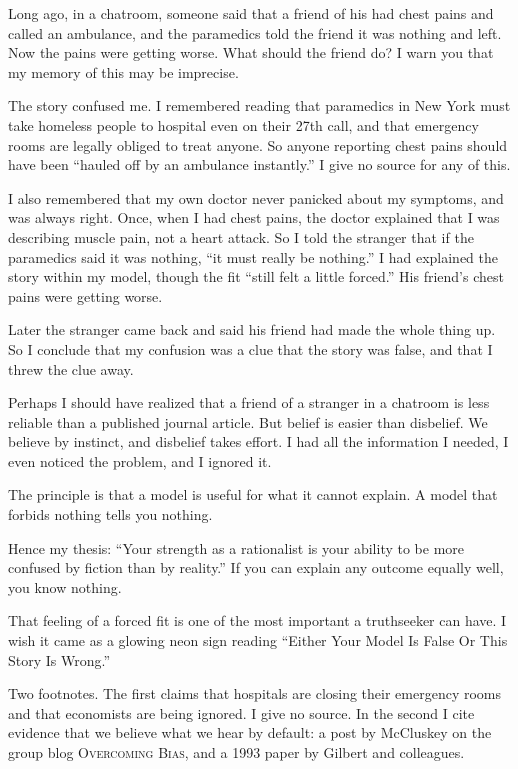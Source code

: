 
Long ago, in a chatroom, someone said that a friend of his had chest pains and called an ambulance, and the paramedics told the friend it was nothing and left. Now the pains were getting worse. What should the friend do? I warn you that my memory of this may be imprecise.

The story confused me. I remembered reading that paramedics in New York must take homeless people to hospital even on their 27th call, and that emergency rooms are legally obliged to treat anyone. So anyone reporting chest pains should have been ``hauled off by an ambulance instantly.'' I give no source for any of this. 

I also remembered that my own doctor never panicked about my symptoms, and was always right. Once, when I had chest pains, the doctor explained that I was describing muscle pain, not a heart attack. So I told the stranger that if the paramedics said it was nothing, ``it must really be nothing.'' I had explained the story within my model, though the fit ``still felt a little forced.'' His friend's chest pains were getting worse. 

Later the stranger came back and said his friend had made the whole thing up. So I conclude that my confusion was a clue that the story was false, and that I threw the clue away. 

Perhaps I should have realized that a friend of a stranger in a chatroom is less reliable than a published journal article. But belief is easier than disbelief. We believe by instinct, and disbelief takes effort. I had all the information I needed, I even noticed the problem, and I ignored it.

The principle is that a model is useful for what it cannot explain. A model that forbids nothing tells you nothing. 

Hence my thesis: ``Your strength as a rationalist is your ability to be more confused by fiction than by reality.'' If you can explain any outcome equally well, you know nothing. 

That feeling of a forced fit is one of the most important a truthseeker can have. I wish it came as a glowing neon sign reading ``Either Your Model Is False Or This Story Is Wrong.'' 

Two footnotes. The first claims that hospitals are closing their emergency rooms and that economists are being ignored. I give no source.  In the second I cite evidence that we believe what we hear by default: a post by McCluskey on the group blog \textsc{Overcoming Bias}, and a 1993 paper by Gilbert and colleagues.
